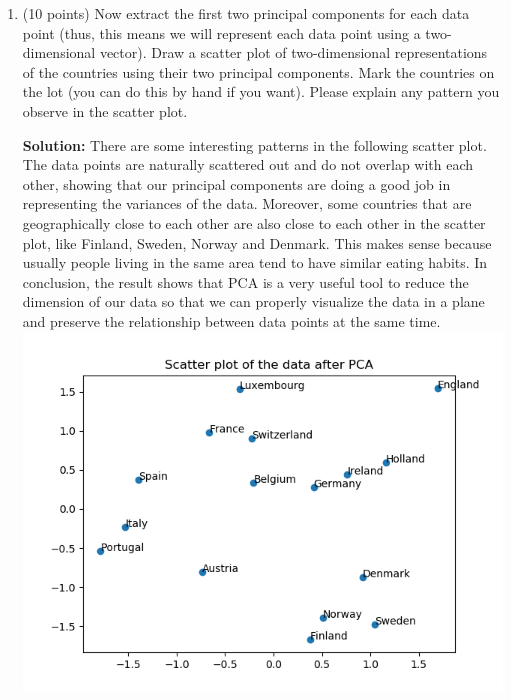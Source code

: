 \documentclass[twoside,12pt]{article}
\begin{document}
\begin{enumerate}
\item (10 points) Now extract the first two principal components for each data point (thus, this means we will represent each data point using a two-dimensional vector). Draw a scatter plot of two-dimensional representations of the countries using their two principal components. Mark the countries on the lot (you can do this by hand if you want). Please explain any pattern you observe in the scatter plot.
\begin{tcolorbox}
\textbf{Solution:} There are some interesting patterns in the following scatter plot. The data points are naturally scattered out and do not overlap with each other, showing that our principal components are doing a good job in representing the variances of the data. Moreover, some countries that are geographically close to each other are also close to each other in the scatter plot, like Finland, Sweden, Norway and Denmark. This makes sense because usually people living in the same area tend to have similar eating habits. In conclusion, the result shows that PCA is a very useful tool to reduce the dimension of our data so that we can properly visualize the data in a plane and preserve the relationship between data points at the same time.\\ 
\includegraphics[width=.99\textwidth]{scatter1.png}
\end{tcolorbox}

\end{enumerate}
\end{document}

